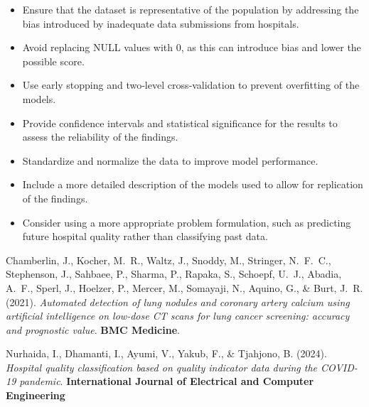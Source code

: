 		\begin{itemize}[topsep=2pt, itemsep=1pt, parsep=0pt, partopsep=0pt]
			\item Ensure that the dataset is representative of the population by addressing the bias introduced by inadequate data submissions from hospitals.
			\item Avoid replacing NULL values with 0, as this can introduce bias and lower the possible score.
			\item Use early stopping and two‐level cross‐validation to prevent overfitting of the models.
			\item Provide confidence intervals and statistical significance for the results to assess the reliability of the findings.
			\item Standardize and normalize the data to improve model performance.
			\item Include a more detailed description of the models used to allow for replication of the findings.
			\item Consider using a more appropriate problem formulation, such as predicting future hospital quality rather than classifying past data.
		\end{itemize}

		\begin{thebibliography}{9}

			Chamberlin, J., Kocher, M.~R., Waltz, J., Snoddy, M., Stringer, N.~F.~C., Stephenson, J.,
			Sahbaee, P., Sharma, P., Rapaka, S., Schoepf, U.~J., Abadia, A.~F., Sperl, J., Hoelzer, P.,
			Mercer, M., Somayaji, N., Aquino, G., \& Burt, J.~R. (2021).
			\emph{Automated detection of lung nodules and coronary artery calcium using artificial intelligence on low-dose CT scans for lung cancer screening: accuracy and prognostic value}. \textbf{BMC Medicine}.

			Nurhaida, I., Dhamanti, I., Ayumi, V., Yakub, F., \& Tjahjono, B. (2024).
			\emph{Hospital quality classification based on quality indicator data during the COVID-19 pandemic}.
			\textbf{International Journal of Electrical and Computer Engineering}


		\end{thebibliography}